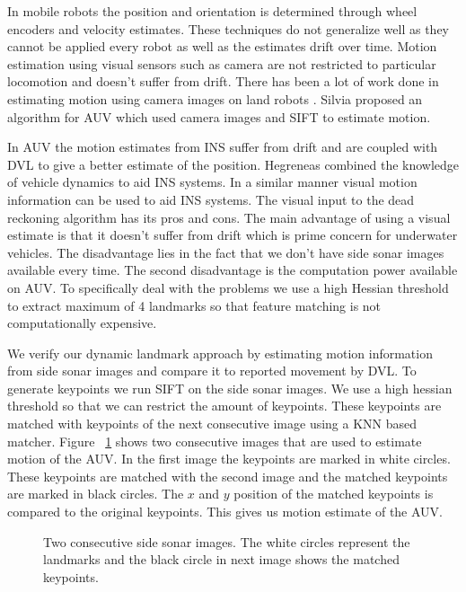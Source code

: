 \documentclass[12pt]{dalcsthesis}
\begin{document}
In mobile robots the position and orientation is determined through wheel encoders and velocity estimates. These techniques do not generalize well as they cannot be applied every robot as well as the estimates drift over time. Motion estimation using visual sensors such as camera are not restricted to particular locomotion and doesn't suffer from drift. There has been a lot of work done in estimating motion using camera images on land robots \cite{barfoot2005online} \cite{scaramuzza2008appearance}. Silvia \cite{Silva} proposed an algorithm for AUV which used camera images and SIFT to estimate motion. 

In AUV the motion estimates from INS suffer from drift and are coupled with DVL to give a better estimate of the position. Hegreneas \cite{hegrenaes2008model} combined the knowledge of vehicle dynamics to aid INS systems. In a similar manner visual motion information can be used to aid INS systems. The visual input to the dead reckoning algorithm has its pros and cons. The main advantage of using a visual estimate is that it doesn't suffer from drift which is prime concern for underwater vehicles. The disadvantage lies in the fact that we don't have side sonar images available every time. The second disadvantage is the computation power available on AUV. To specifically deal with the problems we use a high Hessian threshold to extract maximum of 4 landmarks so that feature matching is not computationally expensive.    

We verify our dynamic landmark approach by estimating motion information from side sonar images and compare it to reported movement by DVL. To generate keypoints we run SIFT on the side sonar images. We use a high hessian threshold so that we can restrict the amount of keypoints. These keypoints are matched with keypoints of the next consecutive image using a KNN based matcher. Figure ~\ref{fig- matched images} shows two consecutive images that are used to estimate motion of the AUV. In the first image the keypoints are marked in white circles. These keypoints are matched with the second image and the matched keypoints are marked in black circles. The $x$ and $y$ position of the matched keypoints is compared to the original keypoints. This gives us motion estimate of the AUV. 

\begin{figure}
  \centering
  \qquad
  \qquad
 \caption{\label{fig- matched images}Two consecutive side sonar images. The white circles represent the landmarks and the black circle in next image shows the matched keypoints.}
\end{figure}
\end{document}
